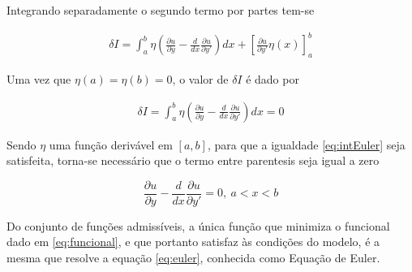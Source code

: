 Integrando separadamente o segundo termo por partes tem-se

\begin{equation}
\begin{split}
\delta I = \int_{a}^{b} \eta \left(\frac{\partial u}{\partial y} - \frac{d}{dx} 
\frac{\partial u}{\partial y'}\right)  dx +
\left[\frac{\partial u}{\partial y'} \eta(x) \right]_a^b
\end{split}
\end{equation}

Uma vez que $\eta(a) = \eta(b) = 0$, o valor de $ \delta I $ é dado por

\begin{equation}
\label{eq:intEuler}
\begin{split}
\delta I = \int_{a}^{b} \eta \left(\frac{\partial u}{\partial y} - \frac{d}{dx} 
\frac{\partial u}{\partial y'}\right)  dx = 0
\end{split}
\end{equation}

Sendo $ \eta $ uma função derivável em $ [a,b] $, para que a igualdade \ref{eq:intEuler} seja satisfeita, torna-se necessário que o termo entre parentesis seja igual a zero

\begin{equation}
\label{eq:euler}
\frac{\partial u}{\partial y} - \frac{d}{dx} 
\frac{\partial u}{\partial y'} = 0, \ a < x < b
\end{equation}

Do conjunto de funções admissíveis, a única função que minimiza o funcional dado em \ref{eq:funcional}, e que portanto satisfaz às condições do modelo, é a mesma que resolve a equação \ref{eq:euler}, conhecida como Equação de Euler.
